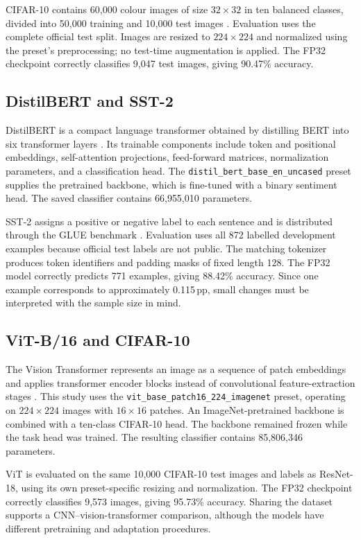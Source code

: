 \documentclass[conference]{IEEEtran}
\newcommand{\pp}{\,pp}
\begin{document}
CIFAR-10 contains 60,000 colour images of size $32\times32$ in ten balanced classes, divided into 50,000 training and 10,000 test images \cite{krizhevsky2009}. Evaluation uses the complete official test split. Images are resized to $224\times224$ and normalized using the preset's preprocessing; no test-time augmentation is applied. The FP32 checkpoint correctly classifies 9,047 test images, giving 90.47\% accuracy.

\subsection{DistilBERT and SST-2}

DistilBERT is a compact language transformer obtained by distilling BERT into six transformer layers \cite{sanh2019}. Its trainable components include token and positional embeddings, self-attention projections, feed-forward matrices, normalization parameters, and a classification head. The \texttt{distil\_bert\_base\_en\_uncased} preset supplies the pretrained backbone, which is fine-tuned with a binary sentiment head. The saved classifier contains 66,955,010 parameters.

SST-2 assigns a positive or negative label to each sentence and is distributed through the GLUE benchmark \cite{socher2013,wang2018}. Evaluation uses all 872 labelled development examples because official test labels are not public. The matching tokenizer produces token identifiers and padding masks of fixed length 128. The FP32 model correctly predicts 771 examples, giving 88.42\% accuracy. Since one example corresponds to approximately 0.115\pp, small changes must be interpreted with the sample size in mind.

\subsection{ViT-B/16 and CIFAR-10}

The Vision Transformer represents an image as a sequence of patch embeddings and applies transformer encoder blocks instead of convolutional feature-extraction stages \cite{dosovitskiy2021}. This study uses the \texttt{vit\_base\_patch16\_224\_imagenet} preset, operating on $224\times224$ images with $16\times16$ patches. An ImageNet-pretrained backbone is combined with a ten-class CIFAR-10 head. The backbone remained frozen while the task head was trained. The resulting classifier contains 85,806,346 parameters.

ViT is evaluated on the same 10,000 CIFAR-10 test images and labels as ResNet-18, using its own preset-specific resizing and normalization. The FP32 checkpoint correctly classifies 9,573 images, giving 95.73\% accuracy. Sharing the dataset supports a CNN--vision-transformer comparison, although the models have different pretraining and adaptation procedures.
\end{document}
